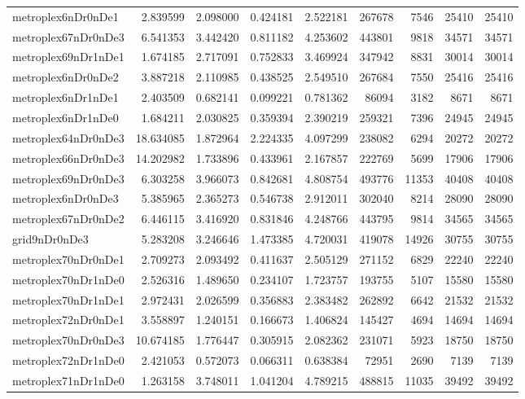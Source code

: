 \begin{longtable}{|l|r|r|r|r|r|r|r|r|}
metroplex6nDr0nDe1 & 2.839599 & 2.098000 & 0.424181 & 2.522181 & 267678 & 7546 & 25410 & 25410 \\
metroplex67nDr0nDe3 & 6.541353 & 3.442420 & 0.811182 & 4.253602 & 443801 & 9818 & 34571 & 34571 \\
metroplex69nDr1nDe1 & 1.674185 & 2.717091 & 0.752833 & 3.469924 & 347942 & 8831 & 30014 & 30014 \\
metroplex6nDr0nDe2 & 3.887218 & 2.110985 & 0.438525 & 2.549510 & 267684 & 7550 & 25416 & 25416 \\
metroplex6nDr1nDe1 & 2.403509 & 0.682141 & 0.099221 & 0.781362 & 86094 & 3182 & 8671 & 8671 \\
metroplex6nDr1nDe0 & 1.684211 & 2.030825 & 0.359394 & 2.390219 & 259321 & 7396 & 24945 & 24945 \\
metroplex64nDr0nDe3 & 18.634085 & 1.872964 & 2.224335 & 4.097299 & 238082 & 6294 & 20272 & 20272 \\
metroplex66nDr0nDe3 & 14.202982 & 1.733896 & 0.433961 & 2.167857 & 222769 & 5699 & 17906 & 17906 \\
metroplex69nDr0nDe3 & 6.303258 & 3.966073 & 0.842681 & 4.808754 & 493776 & 11353 & 40408 & 40408 \\
metroplex6nDr0nDe3 & 5.385965 & 2.365273 & 0.546738 & 2.912011 & 302040 & 8214 & 28090 & 28090 \\
metroplex67nDr0nDe2 & 6.446115 & 3.416920 & 0.831846 & 4.248766 & 443795 & 9814 & 34565 & 34565 \\
grid9nDr0nDe3 & 5.283208 & 3.246646 & 1.473385 & 4.720031 & 419078 & 14926 & 30755 & 30755 \\
metroplex70nDr0nDe1 & 2.709273 & 2.093492 & 0.411637 & 2.505129 & 271152 & 6829 & 22240 & 22240 \\
metroplex70nDr1nDe0 & 2.526316 & 1.489650 & 0.234107 & 1.723757 & 193755 & 5107 & 15580 & 15580 \\
metroplex70nDr1nDe1 & 2.972431 & 2.026599 & 0.356883 & 2.383482 & 262892 & 6642 & 21532 & 21532 \\
metroplex72nDr0nDe1 & 3.558897 & 1.240151 & 0.166673 & 1.406824 & 145427 & 4694 & 14694 & 14694 \\
metroplex70nDr0nDe3 & 10.674185 & 1.776447 & 0.305915 & 2.082362 & 231071 & 5923 & 18750 & 18750 \\
metroplex72nDr1nDe0 & 2.421053 & 0.572073 & 0.066311 & 0.638384 & 72951 & 2690 & 7139 & 7139 \\
metroplex71nDr1nDe0 & 1.263158 & 3.748011 & 1.041204 & 4.789215 & 488815 & 11035 & 39492 & 39492 \\

\end{longtable}
